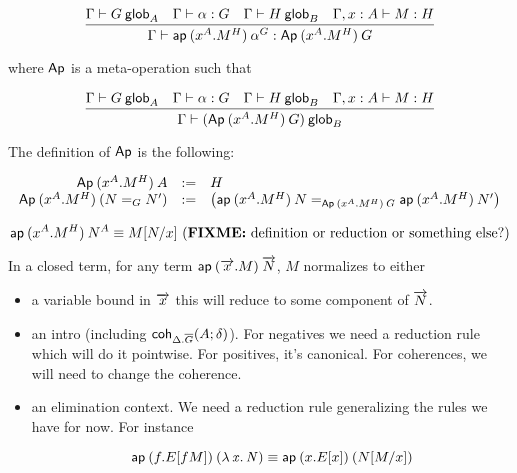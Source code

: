 \begin{small}
  \[\infer{\ofglob{\Gamma}{\ap{(x^A.M^H)}{\alpha^G}}
    {\Ap{(x^A.M^H)}{G}}}
  {\wfglob{\Gamma}{G}{A}
    & \ofglob{\Gamma}{\alpha}{G}
    & \wfglob{\Gamma}{H}{B}
    & \ofglob{\Gamma,x:A}{M}{H}}\]

  where $\dsd{Ap}$ is a meta-operation such that

  \[\infer{\wfglob{\Gamma}{(\Ap{(x^A.M^H)}{G})}
    {B}}
  {\wfglob{\Gamma}{G}{A}
    & \ofglob{\Gamma}{\alpha}{G}
    & \wfglob{\Gamma}{H}{B}
    & \ofglob{\Gamma,x:A}{M}{H}}\]

  The definition of $\dsd{Ap}$ is the following:

  \[
  \begin{array}{rcl}
    \Ap{(x^A.M^H)}{A} & := & H \\
    \Ap{(x^A.M^H)}{(\homj{G}{N}{N'})} & := & \left(
      \homj{\Ap{(x^A.M^H)}{G}}
      {\ap{(x^A.M^H)}{N}}{\ap{(x^A.M^H)}{N'}}\right)
  \end{array}
  \]
\end{small}

\begin{small}
  \[
  \ap{(x^A.M^H)}{N^A}  \equiv  \subst{M}{N}{x}
  \text{ (\FIXME{definition or reduction or something else?})} \\ \\
  \]
\end{small}

In a closed term, for any term $\ap{(\tel{x}.M)}{\tel{N}}$, $M$ normalizes to
either
\begin{itemize}
\item a variable bound in $\tel{x}$ this will reduce to some component of
  $\tel{N}$.
\item an intro (including $\coh{\Delta.\diag G}{A}{\delta}$). For negatives we
  need a reduction rule which will do it pointwise. For positives, it’s
  canonical. For coherences, we will need to change the coherence.
\item an elimination context. We need a reduction rule generalizing the rules we
  have for now. For instance

\[\ap{(f.E[f M])}{(\ulam{x}{N})} \equiv \ap{(x.E[x])}{(\subst{N}{M}{x})}\]

\end{itemize}



